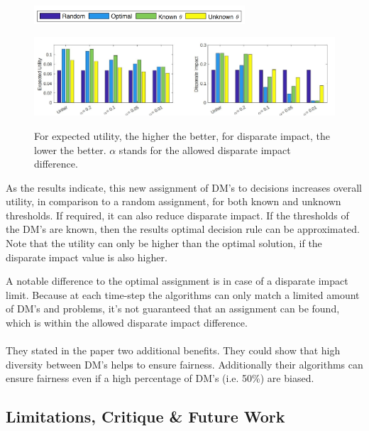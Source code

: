 \documentclass[11pt,a4paper,final]{article}
\begin{document}
\begin{figure}[ht]
    \centering
    \includegraphics[width=0.7\textwidth]{Figures/matching_results_part2.png}
\end{figure}
\begin{figure}[ht]
\includegraphics[width=\textwidth]{Figures/matching_results_part1.pdf}
\label{fig:ma-results}
\caption{For expected utility, the higher the better, for disparate impact, the lower the better. $\alpha$ stands for the allowed disparate impact difference. }
\end{figure}
As the results indicate, this new assignment of DM's to decisions increases overall utility, in comparison to a random assignment, for both known and unknown thresholds. If required, it can also reduce disparate impact. If the thresholds of the DM's are known, then the results optimal decision rule can be approximated.
Note that the utility can only be higher than the optimal solution, if the disparate impact value is also higher. 

A notable difference to the optimal assignment is in case of a disparate impact limit. Because at each time-step the algorithms can only match a limited amount of DM's and problems, it's not guaranteed that an assignment can be found, which is within the allowed disparate impact difference.
\\\\
They stated in the paper two additional benefits. They could show that high diversity between DM's helps to ensure fairness. Additionally their algorithms can ensure fairness even if a high percentage of DM's (i.e. 50\%) are biased.

\subsection{Limitations, Critique \& Future Work}
\end{document}

